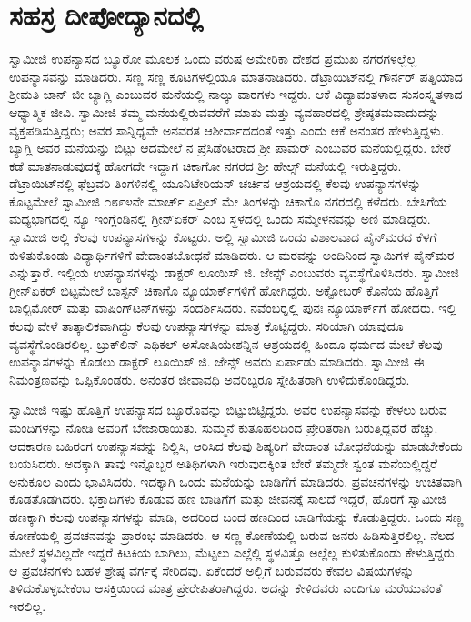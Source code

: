 \chapter{ಸಹಸ್ರ ದೀಪೋದ್ಯಾನದಲ್ಲಿ }

 ಸ್ವಾಮೀಜಿ ಉಪನ್ಯಾಸದ ಬ್ಯೂರೋ ಮೂಲಕ ಒಂದು ವರುಷ ಅಮೇರಿಕಾ ದೇಶದ ಪ್ರಮುಖ ನಗರಗಳಲ್ಲೆಲ್ಲ ಉಪನ್ಯಾಸವನ್ನು ಮಾಡಿದರು. ಸಣ್ಣ ಸಣ್ಣ ಕೂಟಗಳಲ್ಲಿಯೂ ಮಾತನಾಡಿದರು. ಡೆಟ್ರಾಯಿಟ್‍ನಲ್ಲಿ ಗೌರ್ನರ್ ಪತ್ನಿಯಾದ ಶ‍್ರೀಮತಿ ಜಾನ್ ಜೀ ಬ್ಯಾಗ್ಲಿ ಎಂಬುವರ ಮನೆಯಲ್ಲಿ ನಾಲ್ಕು ವಾರಗಳು ಇದ್ದರು. ಆಕೆ ವಿದ್ಯಾವಂತಳಾದ ಸುಸಂಸ್ಕೃತಳಾದ ಆಧ್ಯಾತ್ಮಿಕ ಜೀವಿ. ಸ್ವಾಮೀಜಿ ತಮ್ಮ ಮನೆಯಲ್ಲಿರುವವರೆಗೆ ಮಾತು ಮತ್ತು ವ್ಯವಹಾರದಲ್ಲಿ ಶ್ರೇಷ್ಠತಮವಾದುದನ್ನು ವ್ಯಕ್ತಪಡಿಸುತ್ತಿದ್ದರು; ಅವರ ಸಾನ್ನಿಧ್ಯವೇ ಅನವರತ ಆಶೀರ್ವಾದದಂತೆ ಇತ್ತು ಎಂದು ಆಕೆ ಅನಂತರ ಹೇಳುತ್ತಿದ್ದಳು. ಬ್ಯಾಗ್ಲಿ ಅವರ ಮನೆಯನ್ನು ಬಿಟ್ಟು ಆದಮೇಲೆ ನ ಪ್ರೆಸಿಡೆಂಟರಾದ ಶ‍್ರೀ ಪಾಮರ್ ಎಂಬುವರ ಮನೆಯಲ್ಲಿದ್ದರು. ಬೇರೆ ಕಡೆ ಮಾತನಾಡುವುದಕ್ಕೆ ಹೋಗದೇ ಇದ್ದಾಗ ಚಿಕಾಗೋ ನಗರದ ಶ‍್ರೀ ಹೇಲ್ಸ್ ಮನೆಯಲ್ಲಿ ಇರುತ್ತಿದ್ದರು. ಡೆಟ್ರಾಯಿಟ್‍ನಲ್ಲಿ ಫೆಬ್ರವರಿ ತಿಂಗಳಿನಲ್ಲಿ ಯೂನಿಟೇರಿಯನ್ ಚರ್ಚಿನ ಆಶ್ರಯದಲ್ಲಿ ಕೆಲವು ಉಪನ್ಯಾಸಗಳನ್ನು ಕೊಟ್ಟಮೇಲೆ ಸ್ವಾಮೀಜಿ ೧೮೯೪ನೇ ಮಾರ್ಚ್ ಏಪ್ರಿಲ್ ಮೇ ತಿಂಗಳನ್ನು ಚಿಕಾಗೊ ನಗರದಲ್ಲಿ ಕಳೆದರು. ಬೇಸಿಗೆಯ ಮಧ್ಯಭಾಗದಲ್ಲಿ ನ್ಯೂ ಇಂಗ್ಲೆಂಡಿನಲ್ಲಿ ಗ್ರೀನ್‍ಏಕರ್ ಎಂಬ ಸ್ಥಳದಲ್ಲಿ ಒಂದು ಸಮ್ಮೇಳನವನ್ನು ಅಣಿ ಮಾಡಿದ್ದರು. ಸ್ವಾಮೀಜಿ ಅಲ್ಲಿ ಕೆಲವು ಉಪನ್ಯಾಸಗಳನ್ನು ಕೊಟ್ಟರು. ಅಲ್ಲಿ ಸ್ವಾಮೀಜಿ ಒಂದು ವಿಶಾಲವಾದ ಪೈನ್‍ಮರದ ಕೆಳಗೆ ಕುಳಿತುಕೊಂಡು ವಿದ್ಯಾರ್ಥಿಗಳಿಗೆ ವೇದಾಂತಬೋಧನೆ ಮಾಡಿದರು. ಆ ಮರವನ್ನು ಅಂದಿನಿಂದ ಸ್ವಾಮಿಗಳ ಪೈನ್‍ಮರ ಎನ್ನುತ್ತಾರೆ. ಇಲ್ಲಿಯ ಉಪನ್ಯಾಸಗಳನ್ನು ಡಾಕ್ಟರ್ ಲೂಯಿಸ್ ಜಿ. ಜೇನ್ಸ್ ಎಂಬುವರು ವ್ಯವಸ್ಥೆಗೊಳಿಸಿದರು. ಸ್ವಾಮೀಜಿ ಗ್ರೀನ್‍ಏಕರ್ ಬಿಟ್ಟಮೇಲೆ ಬಾಸ್ಟನ್ ಚಿಕಾಗೊ ನ್ಯೂಯಾರ್ಕ್‍ಗಳಿಗೆ ಹೋಗಿದ್ದರು. ಅಕ್ಟೋಬರ್ ಕೊನೆಯ ಹೊತ್ತಿಗೆ ಬಾಲ್ಟಿಮೋರ್ ಮತ್ತು ವಾಷಿಂಗ್‍ಟನ್‍ಗಳನ್ನು ಸಂದರ್ಶಿಸಿದರು. ನವೆಂಬರ್‍ನಲ್ಲಿ ಪುನಃ ನ್ಯೂಯಾರ್ಕ್‍ಗೆ ಹೋದರು. ಇಲ್ಲಿ ಕೆಲವು ವೇಳೆ ತಾತ್ಕಾಲಿಕವಾಗಿದ್ದು ಕೆಲವು ಉಪನ್ಯಾಸಗಳನ್ನು ಮಾತ್ರ ಕೊಟ್ಟಿದ್ದರು. ಸರಿಯಾಗಿ ಯಾವುದೂ ವ್ಯವಸ್ಥೆಗೊಂಡಿರಲಿಲ್ಲ. ಬ್ರುಕ್‍ಲಿನ್ ಎಥಿಕಲ್ ಅಸೋಷಿಯೇಶನ್ನಿನ ಆಶ್ರಯದಲ್ಲಿ ಹಿಂದೂ ಧರ್ಮದ ಮೇಲೆ ಕೆಲವು ಉಪನ್ಯಾಸಗಳನ್ನು ಕೊಡಲು ಡಾಕ್ಟರ್ ಲೂಯಿಸ್ ಜಿ. ಜೇನ್ಸ್ ಅವರು ಏರ್ಪಾಡು ಮಾಡಿದರು. ಸ್ವಾಮೀಜಿ ಈ ನಿಮಂತ್ರಣವನ್ನು ಒಪ್ಪಿಕೊಂಡರು. ಅನಂತರ ಜೀವಾವಧಿ ಅವರಿಬ್ಬರೂ ಸ್ನೇಹಿತರಾಗಿ ಉಳಿದುಕೊಂಡಿದ್ದರು. 

 ಸ್ವಾಮೀಜಿ ಇಷ್ಟು ಹೊತ್ತಿಗೆ ಉಪನ್ಯಾಸದ ಬ್ಯೂರೊವನ್ನು ಬಿಟ್ಟುಬಿಟ್ಟಿದ್ದರು. ಅವರ ಉಪನ್ಯಾಸವನ್ನು ಕೇಳಲು ಬರುವ ಮಂದಿಗಳನ್ನು ನೋಡಿ ಅವರಿಗೆ ಬೇಜಾರಾಯಿತು. ಸುಮ್ಮನೆ ಕುತೂಹಲದಿಂದ ಪ್ರೇರಿತರಾಗಿ ಬರುತ್ತಿದ್ದವರೆ ಹೆಚ್ಚು. ಆದಕಾರಣ ಬಹಿರಂಗ ಉಪನ್ಯಾಸವನ್ನು ನಿಲ್ಲಿಸಿ, ಆರಿಸಿದ ಕೆಲವು ಶಿಷ್ಯರಿಗೆ ವೇದಾಂತ ಬೋಧನೆಯನ್ನು ಮಾಡಬೇಕೆಂದು ಬಯಸಿದರು. ಅದಕ್ಕಾಗಿ ತಾವು ಇನ್ನೊಬ್ಬರ ಅತಿಥಿಗಳಾಗಿ ಇರುವುದಕ್ಕಿಂತ ಬೇರೆ ತಮ್ಮದೇ ಸ್ವಂತ ಮನೆಯಲ್ಲಿದ್ದರೆ ಅನುಕೂಲ ಎಂದು ಭಾವಿಸಿದರು. ಇದಕ್ಕಾಗಿ ಒಂದು ಮನೆಯನ್ನು ಬಾಡಿಗೆಗೆ ಮಾಡಿದರು. ಪ್ರವಚನಗಳನ್ನು ಉಚಿತವಾಗಿ ಕೊಡತೊಡಗಿದರು. ಭಕ್ತಾದಿಗಳು ಕೊಡುವ ಹಣ ಬಾಡಿಗೆಗೆ ಮತ್ತು ಜೀವನಕ್ಕೆ ಸಾಲದೆ ಇದ್ದರೆ, ಹೊರಗೆ ಸ್ವಾಮೀಜಿ ಹಣಕ್ಕಾಗಿ ಕೆಲವು ಉಪನ್ಯಾಸಗಳನ್ನು ಮಾಡಿ, ಅದರಿಂದ ಬಂದ ಹಣದಿಂದ ಬಾಡಿಗೆಯನ್ನು ಕೊಡುತ್ತಿದ್ದರು. ಒಂದು ಸಣ್ಣ ಕೋಣೆಯಲ್ಲಿ ಪ್ರವಚನವನ್ನು ಪ್ರಾರಂಭ ಮಾಡಿದರು. ಆ ಸಣ್ಣ ಕೋಣೆಯಲ್ಲಿ ಬರುವ ಜನರು ಹಿಡಿಸುತ್ತಿರಲಿಲ್ಲ. ನೆಲದ ಮೇಲೆ ಸ್ಥಳವಿಲ್ಲದೇ ಇದ್ದರೆ ಕಿಟಕಿಯ ಬಾಗಿಲು, ಮೆಟ್ಟಲು ಎಲ್ಲೆಲ್ಲಿ ಸ್ಥಳವಿತ್ತೊ ಅಲ್ಲೆಲ್ಲ ಕುಳಿತುಕೊಂಡು ಕೇಳುತ್ತಿದ್ದರು. ಆ ಪ್ರವಚನಗಳು ಬಹಳ ಶ್ರೇಷ್ಠ ವರ್ಗಕ್ಕೆ ಸೇರಿದವು. ಏಕೆಂದರೆ ಅಲ್ಲಿಗೆ ಬರುವವರು ಕೇವಲ ವಿಷಯಗಳನ್ನು ತಿಳಿದುಕೊಳ್ಳಬೇಕೆಂಬ ಆಸಕ್ತಿಯಿಂದ ಮಾತ್ರ ಪ್ರೇರೇಪಿತರಾಗಿದ್ದರು. ಅದನ್ನು ಕೇಳಿದವರು ಎಂದಿಗೂ ಮರೆಯುವಂತೆ ಇರಲಿಲ್ಲ. 

